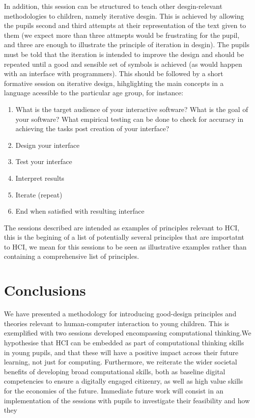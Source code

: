 \documentclass{sig-alternate}
\begin{document}
In addition, this session can be structured to teach other desgin-relevant methodologies to children, namely iterative desgin. This is achieved by allowing the pupils second and third attempts at their representation of the text given to them (we expect more than three attmepts would be frustrating for the pupil, and three are enough to illustrate the principle of iteration in desgin). The pupils must be told that the iteration is intended to improve the design and should be repeated until a good and sensible set of symbols is achieved (as would happen with an interface with programmers). This should be followed by a short formative session on iterative design, hihglighting the main concepts in a language acessible to the particular age group, for instance:
\begin{enumerate}
\item What is the target audience of your interactive software? What is the goal of your software? What empirical testing can be done to check for accuracy in achieving the tasks post creation of your interface?
\item Design your interface 
\item Test your interface
\item Interpret results
\item Iterate (repeat)
\item End when satisfied with resulting interface
\end{enumerate}


The sessions described are intended as examples of principles relevant to HCI, this is the begining of a list of potentially several principles that are importatnt to HCI, we mean for this sessions to be seen as illustrative examples rather than containing a comprehensive list of principles.


\section{Conclusions}
We have presented a methodology for introducing good-design principles and theories relevant to human-computer interaction to young children. This is exemplified with two sessions developed encompassing computational thinking.We hypothesise that HCI can be embedded as part of computational thinking skills in young pupils, and that these will have a positive impact across their future learning, not just for computing. Furthermore, we reiterate the wider societal benefits of developing broad computational skills, both as baseline digital competencies to ensure a digitally engaged citizenry, as well as high value skills for the economies of the future.
Immediate future work will consist in an implementation of the sessions with pupils to investigate their feasibility and how they 
\end{document}

